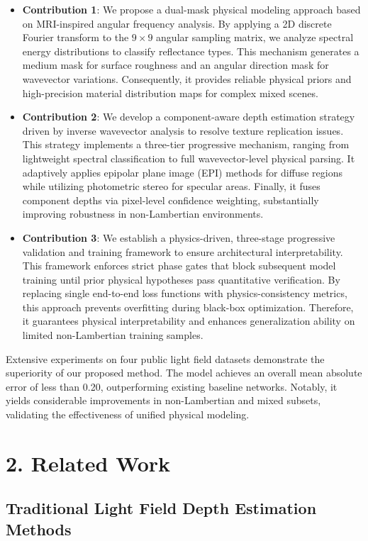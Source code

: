 \documentclass[lettersize,journal]{IEEEtran}
\begin{document}
\begin{itemize}
  \item \textbf{Contribution 1}: We propose a dual-mask physical modeling approach based on MRI-inspired angular frequency analysis. By applying a 2D discrete Fourier transform to the $9 \times 9$ angular sampling matrix, we analyze spectral energy distributions to classify reflectance types. This mechanism generates a medium mask for surface roughness and an angular direction mask for wavevector variations. Consequently, it provides reliable physical priors and high-precision material distribution maps for complex mixed scenes.
  \item \textbf{Contribution 2}: We develop a component-aware depth estimation strategy driven by inverse wavevector analysis to resolve texture replication issues. This strategy implements a three-tier progressive mechanism, ranging from lightweight spectral classification to full wavevector-level physical parsing. It adaptively applies epipolar plane image (EPI) methods for diffuse regions while utilizing photometric stereo for specular areas. Finally, it fuses component depths via pixel-level confidence weighting, substantially improving robustness in non-Lambertian environments.
  \item \textbf{Contribution 3}: We establish a physics-driven, three-stage progressive validation and training framework to ensure architectural interpretability. This framework enforces strict phase gates that block subsequent model training until prior physical hypotheses pass quantitative verification. By replacing single end-to-end loss functions with physics-consistency metrics, this approach prevents overfitting during black-box optimization. Therefore, it guarantees physical interpretability and enhances generalization ability on limited non-Lambertian training samples.
\end{itemize}
Extensive experiments on four public light field datasets demonstrate the superiority of our proposed method. The model achieves an overall mean absolute error of less than 0.20, outperforming existing baseline networks. Notably, it yields considerable improvements in non-Lambertian and mixed subsets, validating the effectiveness of unified physical modeling.

\section{2. Related Work}

\subsection{Traditional Light Field Depth Estimation Methods}
\end{document}
